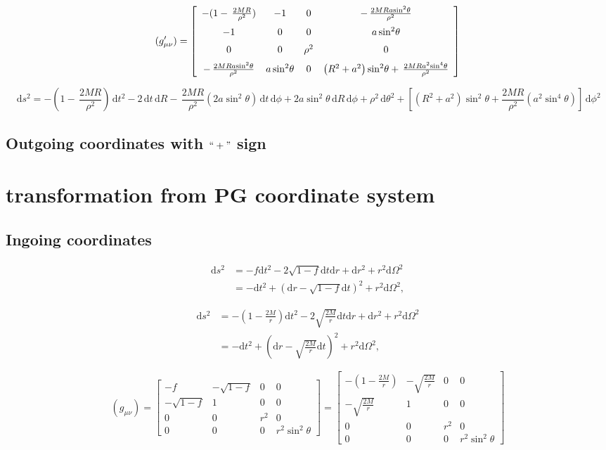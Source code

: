 \documentclass{article}
\newcommand{\be}{\begin{equation}}
\newcommand{\ee}{\end{equation}}
\newcommand{\ba}{\begin{array}}
\newcommand{\ea}{\end{array}}
\newcommand{\dif}{\,\mathrm{d}}
\newcommand{\1}{\left}
\newcommand{\2}{\right}
\begin{document}
\be 
(g^\prime_{\mu\nu})=\left[ \begin {array}{cccc} -(1-\,{\frac {2MR}{{\rho}^{2}}})&-1&0&-\,{
\frac {2MRa{\sin}^{2}\theta}{{\rho}^{2}}}\\ \noalign{\medskip}-1&0&0&
a\,{\sin}^{2}\theta\\ \noalign{\medskip}0&0&{\rho}^{2}&0
\\ \noalign{\medskip}-\,{\frac {2MRa{\sin}^{2}\theta}{{\rho}^{2}}}&
a\,{\sin}^{2}\theta&0& \left( {R}^{2}+{a}^{2} \right) {\sin}^{2}\theta
+\,{\frac {2MR{a}^{2}{\sin}^{4}\theta}{{\rho}^{2}}}\end {array}
 \right] 
\ee

\be 
\dif s^2=-(1-\,{\frac {2MR}{{\rho}^{2}}})\dif t^2-2\dif t \dif R-\,{
\frac {2MR}{{\rho}^{2}}}(2a{\sin}^{2}\theta)\dif t\dif\phi +2a\sin^2\theta \dif R\dif\phi+\rho^2\dif \theta^2+\1[(R^2+a^2)\sin^2\theta+\frac{2MR}{\rho^2}(a^2\sin^4\theta)\2]\dif\phi^2
\ee

\subsection{Outgoing coordinates with $``+"$ sign}

\newpage
\section{transformation from PG coordinate system}
\subsection{Ingoing coordinates}

\be
\begin{split}
\mathrm ds^2&=-f\mathrm dt^2-2\sqrt{1-f}\mathrm dt\mathrm dr+\mathrm dr^2+r^2\mathrm d\Omega^2\\
&=- \mathrm dt^2+(\mathrm dr- \sqrt{1-f}\mathrm dt)^2+r^2\mathrm d\Omega^2,
\end{split}
\ee

\be
\begin{split}
\mathrm ds^2&=-(1-\frac{2M}{r})\mathrm dt^2-2\sqrt{\frac{2M}{r}}\mathrm dt\mathrm dr+\mathrm dr^2+r^2\mathrm d\Omega^2\\
&=- \mathrm dt^2+(\mathrm dr- \sqrt{\frac{2M}{r}}\mathrm dt)^2+r^2\mathrm d\Omega^2,
\end{split}
\ee

\be
(g_{\mu\nu})=\left[\ba{cccc}-f&-\sqrt{1-f}&0&0\\-\sqrt{1-f}&1&0&0\\0&0&r^2&0\\0&0&0&r^2\sin^2\theta\ea\right]=\left[\ba{cccc}-(1-\frac{2M}{r})&-\sqrt{\frac{2M}{r}}&0&0\\-\sqrt{\frac{2M}{r}}&1&0&0\\0&0&r^2&0\\0&0&0&r^2\sin^2\theta\ea\right]
\ee
\end{document}
